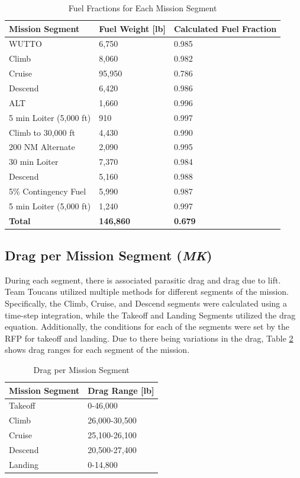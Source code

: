 \begin{table}[!h]
    \centering
    \caption{Fuel Fractions for Each Mission Segment}
    \begin{tabular}{|p{1.75in}||p{1in}|p{1.5in}|}\toprule 
    \textbf{Mission Segment} & \textbf{Fuel Weight [lb]} & \textbf{Calculated Fuel Fraction}\\ \hline \hline
    WUTTO & 6,750 & 0.985 \\ \hline
    Climb & 8,060 & 0.982  \\ \hline
    Cruise & 95,950 & 0.786 \\ \hline
    Descend & 6,420 & 0.986 \\ \hline
    ALT & 1,660 & 0.996 \\ \hline
    5 min Loiter (5,000 ft) & 910 & 0.997 \\ \hline
    Climb to 30,000 ft & 4,430 & 0.990 \\
    \hline
    200 NM Alternate & 2,090 & 0.995 \\ \hline
    30 min Loiter & 7,370 & 0.984 \\ \hline
    Descend & 5,160 & 0.988 \\ \hline
    5\% Contingency Fuel & 5,990 & 0.987 \\ \hline
    5 min Loiter (5,000 ft) & 1,240 & 0.997 \\ \hline
    \textbf{Total} & \textbf{146,860} & \textbf{0.679} \\
    \bottomrule
    \end{tabular}
    \label{fuelfrac}
\end{table}

\subsection{Drag per Mission Segment (\textit{MK})}
During each segment, there is associated parasitic drag and drag due to lift. Team Toucans utilized multiple methods for different segments of the mission. Specifically, the Climb, Cruise, and Descend segments were calculated using a time-step integration, while the Takeoff and Landing Segments utilized the drag equation. Additionally, the conditions for each of the segments were set by the RFP for takeoff and landing. Due to there being variations in the drag, Table \ref{dragseg} shows drag ranges for each segment of the mission. 

\begin{table}[h]
    \centering
    \caption{Drag per Mission Segment}
    \begin{tabular}{|p{1.5in}|p{1in}|}\toprule 
    \textbf{Mission Segment} & \textbf{Drag Range [lb]} \\ \hline \hline
    Takeoff & 0-46,000 \\ \hline
    Climb & 26,000-30,500   \\ \hline
    Cruise & 25,100-26,100 \\ \hline
    Descend & 20,500-27,400 \\ \hline
    Landing & 0-14,800 \\
    \bottomrule
    \end{tabular}
    \label{dragseg}
\end{table}

